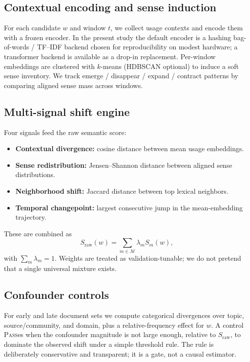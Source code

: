 \documentclass[journal]{IEEEtran}
\begin{document}
\subsection{Contextual encoding and sense induction}
For each candidate $w$ and window $t$, we collect usage contexts and encode them with a frozen encoder.
In the present study the default encoder is a hashing bag-of-words / TF--IDF backend chosen for reproducibility on modest hardware; a transformer backend is available as a drop-in replacement.
Per-window embeddings are clustered with $k$-means (HDBSCAN optional) to induce a soft sense inventory.
We track emerge / disappear / expand / contract patterns by comparing aligned sense mass across windows.

\subsection{Multi-signal shift engine}
Four signals feed the raw semantic score:
\begin{itemize}
\item \textbf{Contextual divergence:} cosine distance between mean usage embeddings.
\item \textbf{Sense redistribution:} Jensen--Shannon distance between aligned sense distributions.
\item \textbf{Neighborhood shift:} Jaccard distance between top lexical neighbors.
\item \textbf{Temporal changepoint:} largest consecutive jump in the mean-embedding trajectory.
\end{itemize}
These are combined as
\begin{equation}
S_{\mathrm{raw}}(w)=\sum_{m\in\mathcal{M}} \lambda_m S_m(w),
\end{equation}
with $\sum_m \lambda_m=1$.
Weights are treated as validation-tunable; we do not pretend that a single universal mixture exists.

\subsection{Confounder controls}
For early and late document sets we compute categorical divergences over topic, source/community, and domain, plus a relative-frequency effect for $w$.
A control \textsc{Pass}es when the confounder magnitude is not large enough, relative to $S_{\mathrm{raw}}$, to dominate the observed shift under a simple threshold rule.
The rule is deliberately conservative and transparent; it is a gate, not a causal estimator.
\end{document}
